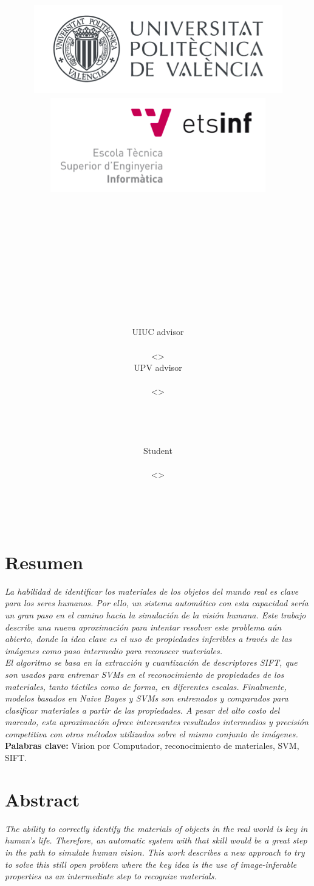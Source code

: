 \documentclass[12pt,a4paper,twoside]{article}
\title{
    \vspace{-1in}
    \begin{figure}[ht!]
        \centering
        \begin{minipage}{0.42\textwidth}
            \centering
            \includegraphics[width=\textwidth]{Images/UPV.png}
        \end{minipage}    
        \hspace{0.15\textwidth}
        \begin{minipage}{0.42\textwidth}
            \centering
            \includegraphics[width=\textwidth]{Images/ETSINF.png}
        \end{minipage}
    \end{figure}
    \vspace{0.5in}
    \textcolor{gray}{\Large\hmwkSchool} \\
    \textcolor{gray}{\Large\hmwkUniversity} \\
    \vspace{1.2in}
    \textmd{\textbf{\huge\hmwkTitle}}\\
    \vspace{0.3in}
    \large\hmwkClass \\
    \vspace{0.15in}
    \Large\hmwkDegree
    \vspace{2.5in}
}
\date{}
\author{
	\begin{minipage}{0.48\textwidth}
		\vspace{-3cm}
		\centering
		{\small UIUC advisor \\}
		\textbf{\hmwkAuthorNameA} \\\small<\texttt{\href{mailto:daf@illinois.edu}{\hmwkAuthorEmailA}}> 
	\end{minipage}
	\begin{minipage}{0.48\textwidth}
		\vspace{-3cm}
		\centering
		{\small UPV advisor \\}
		\textbf{\hmwkAuthorNameB} \\\small<\texttt{\href{mailto:rparedes@dsic.upv.es}{\hmwkAuthorEmailB}}>
	\end{minipage} \\\\\\
	\begin{minipage}{0.48\textwidth}
		\vspace{-1.5cm}
		\centering
		{\small Student \\}
		\textbf{\hmwkAuthorNameC} \\\small<\texttt{\href{mailto:josruice@upv.es}{\hmwkAuthorEmailC}}>
	\end{minipage} \\\\\\
    \textcolor{gray}{\large\hmwkYear}
}
\begin{document}
\begin{singlespace}

\begin{titlepage}
\maketitle
\thispagestyle{empty}
\newpage\null\thispagestyle{empty}\newpage %
\end{titlepage}


\section*{Resumen}
\emph{La habilidad de identificar los materiales de los objetos del mundo real es clave para los seres humanos. Por ello, un sistema automático con esta capacidad sería un gran paso en el camino hacia la simulación de la visión humana. Este trabajo describe una nueva aproximación para intentar resolver este problema aún abierto, donde la idea clave es el uso de propiedades inferibles a través de las imágenes como paso intermedio para reconocer materiales.} \\

\emph{El algoritmo se basa en la extracción y cuantización de descriptores \emph{SIFT}, que son usados para entrenar \emph{SVMs} en el reconocimiento de propiedades de los materiales, tanto táctiles como de forma, en diferentes escalas. Finalmente, modelos basados en \emph{Naive Bayes} y \emph{SVMs} son entrenados y comparados para clasificar materiales a partir de las propiedades. A pesar del alto costo del marcado, esta aproximación ofrece interesantes resultados intermedios y precisión competitiva con otros métodos utilizados sobre el mismo conjunto de imágenes.} \\

\textbf{Palabras clave:} Vision por Computador, reconocimiento de materiales, SVM, SIFT.

\vspace{2cm}

\section*{Abstract}
\emph{The ability to correctly identify the materials of objects in the real world is key in human's life. Therefore, an automatic system with that skill would be a great step in the path to simulate human vision. This work describes a new approach to try to solve this still open problem where the key idea is the use of image-inferable properties as an intermediate step to recognize materials.} \\


\end{singlespace}
\end{document}
